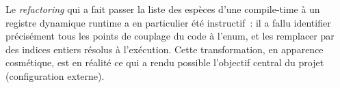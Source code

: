 Le \emph{refactoring} qui a fait passer la liste des espèces
d'une  compile-time à un registre dynamique
runtime a en particulier été instructif~: il a fallu
identifier précisément tous les points de couplage du code à
l'enum, et les remplacer par des indices entiers résolus à
l'exécution. Cette transformation, en apparence cosmétique,
est en réalité ce qui a rendu possible l'objectif central du
projet (configuration externe).
